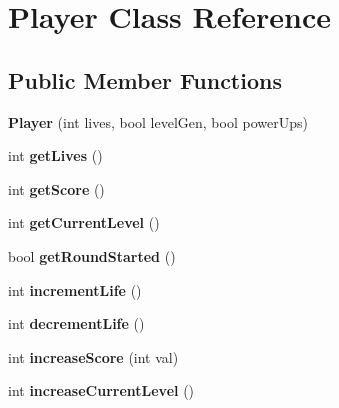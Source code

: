\hypertarget{class_player}{\section{Player Class Reference}
\label{class_player}
}
\subsection*{Public Member Functions}
\begin{DoxyCompactItemize}
\item 
\hypertarget{class_player_a338911228050aac83209fc91f459ad6a}{{\bfseries Player} (int lives, bool level\+Gen, bool power\+Ups)}\label{class_player_a338911228050aac83209fc91f459ad6a}

\item 
\hypertarget{class_player_af56ac33b9b2ebd9f97c8a6f485cf2d47}{int {\bfseries get\+Lives} ()}\label{class_player_af56ac33b9b2ebd9f97c8a6f485cf2d47}

\item 
\hypertarget{class_player_a97e5447778ae6c384eedc532dcd8431d}{int {\bfseries get\+Score} ()}\label{class_player_a97e5447778ae6c384eedc532dcd8431d}

\item 
\hypertarget{class_player_a3c1737f7d71990bf2c6a7d655e4e7477}{int {\bfseries get\+Current\+Level} ()}\label{class_player_a3c1737f7d71990bf2c6a7d655e4e7477}

\item 
\hypertarget{class_player_acea3402d95e62499acd9cf4a37cb3a96}{bool {\bfseries get\+Round\+Started} ()}\label{class_player_acea3402d95e62499acd9cf4a37cb3a96}

\item 
\hypertarget{class_player_a830e302da448a75b8ecd8def6608ff30}{int {\bfseries increment\+Life} ()}\label{class_player_a830e302da448a75b8ecd8def6608ff30}

\item 
\hypertarget{class_player_a62ca25abc6407794000523c1f7bda649}{int {\bfseries decrement\+Life} ()}\label{class_player_a62ca25abc6407794000523c1f7bda649}

\item 
\hypertarget{class_player_a4ffc60110201dcbedc0c83e7b067bed9}{int {\bfseries increase\+Score} (int val)}\label{class_player_a4ffc60110201dcbedc0c83e7b067bed9}

\item 
\hypertarget{class_player_acd7d911c585110e7a05c5c270a5ab35a}{int {\bfseries increase\+Current\+Level} ()}\label{class_player_acd7d911c585110e7a05c5c270a5ab35a}


\end{DoxyCompactItemize}
